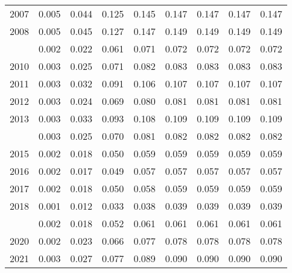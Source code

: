 \documentclass[
]{article}
\begin{document}
\begin{longtable}[t]{lrrrrrrrr}
2007 & 0.005 & 0.044 & 0.125 & 0.145 & 0.147 & 0.147 & 0.147 & 0.147\\
2008 & 0.005 & 0.045 & 0.127 & 0.147 & 0.149 & 0.149 & 0.149 & 0.149\\
\addlinespace
2009 & 0.002 & 0.022 & 0.061 & 0.071 & 0.072 & 0.072 & 0.072 & 0.072\\
2010 & 0.003 & 0.025 & 0.071 & 0.082 & 0.083 & 0.083 & 0.083 & 0.083\\
2011 & 0.003 & 0.032 & 0.091 & 0.106 & 0.107 & 0.107 & 0.107 & 0.107\\
2012 & 0.003 & 0.024 & 0.069 & 0.080 & 0.081 & 0.081 & 0.081 & 0.081\\
2013 & 0.003 & 0.033 & 0.093 & 0.108 & 0.109 & 0.109 & 0.109 & 0.109\\
\addlinespace
2014 & 0.003 & 0.025 & 0.070 & 0.081 & 0.082 & 0.082 & 0.082 & 0.082\\
2015 & 0.002 & 0.018 & 0.050 & 0.059 & 0.059 & 0.059 & 0.059 & 0.059\\
2016 & 0.002 & 0.017 & 0.049 & 0.057 & 0.057 & 0.057 & 0.057 & 0.057\\
2017 & 0.002 & 0.018 & 0.050 & 0.058 & 0.059 & 0.059 & 0.059 & 0.059\\
2018 & 0.001 & 0.012 & 0.033 & 0.038 & 0.039 & 0.039 & 0.039 & 0.039\\
\addlinespace
2019 & 0.002 & 0.018 & 0.052 & 0.061 & 0.061 & 0.061 & 0.061 & 0.061\\
2020 & 0.002 & 0.023 & 0.066 & 0.077 & 0.078 & 0.078 & 0.078 & 0.078\\
2021 & 0.003 & 0.027 & 0.077 & 0.089 & 0.090 & 0.090 & 0.090 & 0.090\\*
\end{longtable}
\end{document}
